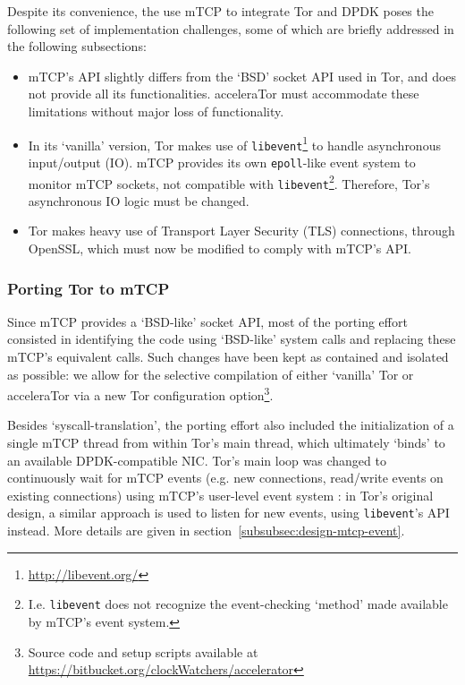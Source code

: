 Despite its convenience, the use mTCP to integrate Tor and DPDK poses the 
following set of implementation challenges, some of which are briefly addressed 
in the following subsections:

\begin{itemize}
	\item mTCP's API slightly differs from the `BSD' socket API used in Tor, and 
		does not provide all its functionalities. acceleraTor must accommodate 
		these limitations without major loss of functionality.
	\item In its `vanilla' version, Tor makes use 
		of \verb+libevent+\footnote{\url{http://libevent.org/}} to handle 
		asynchronous input\slash output (IO). mTCP provides 
		its own \verb+epoll+-like event system to monitor mTCP sockets, not 
		compatible with \verb+libevent+\cprotect\footnote{I.e. \verb+libevent+ does not 
		recognize the event-checking `method' made available 
		by mTCP's event system.}. Therefore, Tor's asynchronous IO logic must 
		be changed.
	\item Tor makes heavy use of Transport Layer Security (TLS) connections, 
		through OpenSSL, which must 
		now be modified to comply with mTCP's API.
\end{itemize}

\subsubsection{Porting Tor to mTCP}
\label{subsubsec:design-mtcp-port}

Since mTCP provides a `BSD-like' socket API, most of the porting effort 
consisted in identifying the code using `BSD-like' system calls and 
replacing these mTCP's equivalent calls. Such changes have been kept as 
contained and isolated as possible: we allow for the selective  
compilation of either `vanilla' Tor or acceleraTor via a new 
Tor configuration option\footnote{Source code and setup scripts available 
at \url{https://bitbucket.org/clockWatchers/accelerator}}.

Besides `syscall-translation', the porting effort also included the 
initialization of a single mTCP thread from within Tor's main thread, 
which ultimately `binds' to an available DPDK-compatible NIC. Tor's main loop 
was changed to continuously wait for mTCP events (e.g. new connections, 
read\slash write events on existing connections) using mTCP's user-level event 
system : in Tor's original design, a similar approach is used to listen for 
new events, using \verb+libevent+'s API instead. More details are given in 
section~\ref{subsubsec:design-mtcp-event}.

